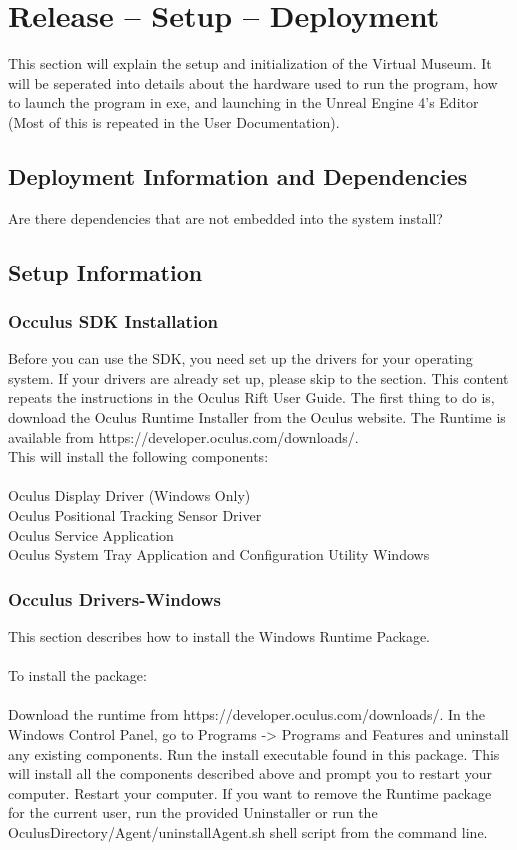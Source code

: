 \chapter{Release -- Setup -- Deployment}
This section will explain the setup and initialization of the Virtual Museum. It will be seperated into details about the hardware used to run the program, how to launch the program in exe, and launching in the Unreal Engine 4's Editor (Most of this is repeated in the User Documentation).


\section{Deployment Information and Dependencies}
Are there dependencies that are not embedded into the system install? 



\section{Setup Information}

\subsection{Occulus SDK Installation}
Before you can use the SDK, you need set up the drivers for your operating system. If your drivers are already set up, please skip to the  section. This content repeats the instructions in the Oculus Rift User Guide. The first thing to do is, download the Oculus Runtime Installer from the Oculus website. The Runtime is available from https://developer.oculus.com/downloads/.
\\ This will install the following components:
\\
\\Oculus Display Driver (Windows Only)
\\ Oculus Positional Tracking Sensor Driver
\\ Oculus Service Application
\\ Oculus System Tray Application and Configuration Utility Windows
\\

\subsection{Occulus Drivers-Windows}

This section describes how to install the Windows Runtime Package.
\\
\\To install the package:
\\
\\
Download the runtime from https://developer.oculus.com/downloads/. In the Windows Control Panel, go to Programs -> Programs and Features and uninstall any existing components. Run the install executable found in this package. This will install all the components described above and prompt you to restart your computer. Restart your computer. If you want to remove the Runtime package for the current user, run the provided Uninstaller or run the OculusDirectory/Agent/uninstallAgent.sh shell script from the command line.


